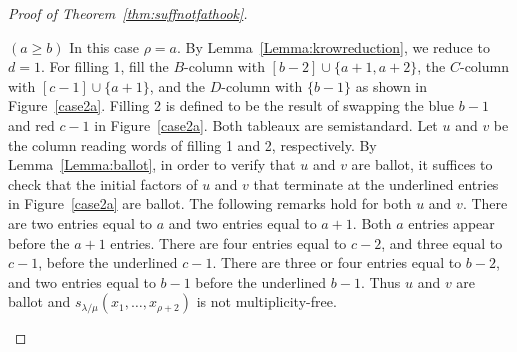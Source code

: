 \begin{proof}[Proof of Theorem~\ref{thm:suffnotfathook}]
\begin{Case}
\begin{figure}[htb]
\end{figure}

\end{Case}

\begin{Case}
{ $(a\geq b)$} In this case $\rho = a$. By Lemma~\ref{Lemma:krowreduction}, we reduce to $d=1$. For filling 1, fill the $B$-column with $[b-2]\cup\{a+1,a+2\}$, the $C$-column with $[c-1]\cup\{a+1\}$, and the $D$-column with $\{b-1\}$ as shown in Figure~\ref{case2a}. Filling 2 is defined to be the result of swapping the blue $b-1$ and red $c-1$ in Figure~\ref{case2a}. Both tableaux are semistandard. Let $u$ and $v$ be the column reading words of filling 1 and 2, respectively. By Lemma~\ref{Lemma:ballot}, in order to verify that $u$ and $v$ are ballot, it suffices to check that the initial factors of $u$ and $v$ that terminate at the underlined entries in Figure~\ref{case2a} are ballot. The following remarks hold for both $u$ and $v$. There are two entries equal to $a$ and two entries equal to $a+1$. Both $a$ entries appear before the $a+1$ entries. There are four entries equal to $c-2$, and three equal to $c-1$, before the underlined $c-1$. There are three or four entries equal to $b-2$, and two entries equal to $b-1$ before the underlined $b-1$. Thus $u$ and $v$ are ballot and $s_{\lambda/\mu}(x_1,\ldots,x_{\rho+2})$ is not multiplicity-free. 

\begin{figure}[htb]\centering
\end{figure}
\end{Case}
\end{proof}
